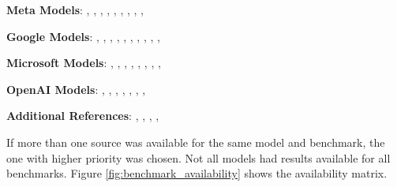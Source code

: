         \begin{tcolorbox}[colback=gray!10, colframe=black, boxrule=1pt, rounded corners]
            \textbf{Meta Models}: 
            \cite{MetaLlama4Scout}, 
            \cite{MetaLlama3.2-3B}, 
            \cite{MetaLlama3.2-1B}, 
            \cite{MetaLlama3.1-70B}, 
            \cite{MetaLlama3.1-8B}, 
            \cite{MetaLlama3-70B}, 
            \cite{MetaLlama3-8B}, 
            \cite{MetaLlama2-70b}, 
            \cite{MetaLlama2-13b}, 
            \cite{MetaLlama2-7b}
            
            \textbf{Google Models}: 
            \cite{GoogleGemma3-27b}, 
            \cite{GoogleGemma3-12b}, 
            \cite{GoogleGemma3-4b}, 
            \cite{GoogleGemma3-1b}, 
            \cite{GoogleGemma2-27b}, 
            \cite{GoogleGemma2-9b}, 
            \cite{GoogleGemma2-2b}, 
            \cite{GoogleGemma-7b}, 
            \cite{GoogleGemma-2b}, 
            \cite{GoogleRecurrentGemma-9b}, 
            \cite{GoogleRecurrentGemma-2b}
            
            \textbf{Microsoft Models}: 
            \cite{MicrosoftPhi4-mini-reasoning}, 
            \cite{MicrosoftPhi4-reasoning}, 
            \cite{MicrosoftPhi4-reasoning-plus}, 
            \cite{MicrosoftPhi4}, 
            \cite{MicrosoftPhi2}, 
            \cite{MicrosoftPhi1-5}, 
            \cite{MicrosoftPhi1}, 
            \cite{Phi1.5}, 
            \cite{Phi2Blog}
            
            \textbf{OpenAI Models}: 
            \cite{OpenAIGPT-oss-120b}, 
            \cite{OpenAIGPT-oss-20b}, 
            \cite{OpenAIGPT2-xl}, 
            \cite{OpenAIGPT2-large}, 
            \cite{OpenAIGPT2-medium}, 
            \cite{OpenAIGPT2}, 
            \cite{OpenAIOpenModels},
            
            \textbf{Additional References}: 
            \cite{HuggingFaceMain}, 
            \cite{Ollama},
            \cite{LLMExplorer}, 
            \cite{RankedAGI},
        \end{tcolorbox} 

        If more than one source was available for the same model and benchmark, the one with higher priority was chosen. Not all models had results available for all benchmarks. Figure \ref{fig:benchmark_availability} shows the availability matrix.

